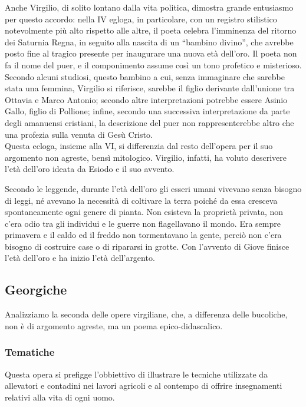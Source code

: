 \documentclass[10pt,a4paper]{article}
\begin{document}
	Anche Virgilio, di solito lontano dalla vita politica, dimostra grande entusiasmo per questo accordo: nella IV egloga, in particolare, con un registro stilistico notevolmente più alto rispetto alle altre, il poeta celebra l'imminenza del ritorno dei Saturnia Regna, in seguito alla nascita di un “bambino divino”, che avrebbe posto fine al tragico presente per inaugurare una nuova età dell'oro. Il poeta non fa il nome del puer, e il componimento assume così un tono profetico e misterioso. Secondo alcuni studiosi, questo bambino a cui, senza immaginare che sarebbe stata una femmina, Virgilio si riferisce, sarebbe il figlio derivante dall'unione tra Ottavia e Marco Antonio; secondo altre interpretazioni potrebbe essere Asinio Gallo, figlio di Pollione; infine, secondo una successiva interpretazione da parte degli amanuensi cristiani, la descrizione del puer non rappresenterebbe altro che una profezia sulla venuta di Gesù Cristo.\\
	
	
	Questa ecloga, insieme alla VI, si differenzia dal resto dell'opera per il suo argomento non agreste, bensì mitologico. Virgilio, infatti, ha voluto descrivere l'età dell'oro ideata da Esiodo e il suo avvento. 
	
	Secondo le leggende, durante l'età dell'oro gli esseri umani vivevano senza bisogno di leggi, né avevano la necessità di coltivare la terra poiché da essa cresceva spontaneamente ogni genere di pianta. Non esisteva la proprietà privata, non c'era odio tra gli individui e le guerre non flagellavano il mondo. Era sempre primavera e il caldo ed il freddo non tormentavano la gente, perciò non c'era bisogno di costruire case o di ripararsi in grotte. Con l'avvento di Giove finisce l'età dell'oro e ha inizio l'età dell'argento.
	
	\vfil
	
	\subsection*{Georgiche}
	
	Analizziamo la seconda delle opere virgiliane, che, a differenza delle bucoliche, non è di argomento agreste, ma un poema epico-didascalico. 
	
	\subsubsection*{Tematiche}
	
	Questa opera si prefigge l'obbiettivo di illustrare le tecniche utilizzate da allevatori e contadini nei lavori agricoli e al contempo di offrire insegnamenti relativi alla vita di ogni uomo.
	
\end{document}

